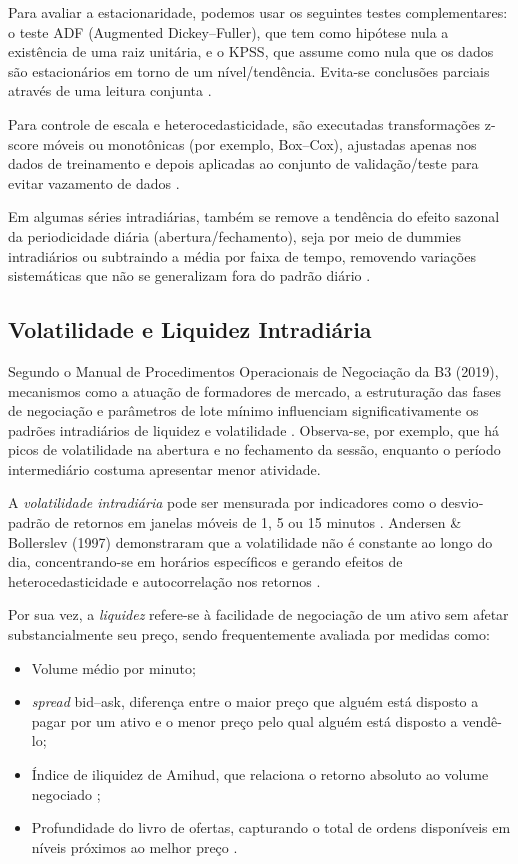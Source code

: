 Para avaliar a estacionaridade, podemos usar os seguintes testes complementares: o teste ADF (Augmented Dickey–Fuller), que tem como hipótese nula a existência de uma raiz unitária, e o KPSS, que assume como nula que os dados são estacionários em torno de um nível/tendência. Evita-se conclusões parciais através de uma leitura conjunta \cite{saiddickey1984}.

Para controle de escala e heterocedasticidade, são executadas transformações z-score móveis ou monotônicas (por exemplo, Box–Cox), ajustadas apenas nos dados de treinamento e depois aplicadas ao conjunto de validação/teste para evitar vazamento de dados \cite{hyndman2021fpp3}.

Em algumas séries intradiárias, também se remove a tendência do efeito sazonal da periodicidade diária (abertura/fechamento), seja por meio de dummies intradiários ou subtraindo a média por faixa de tempo, removendo variações sistemáticas que não se generalizam fora do padrão diário \cite{dacorogna2001}.


\subsection{Volatilidade e Liquidez Intradiária}

Segundo o Manual de Procedimentos Operacionais de Negociação da B3 (2019), mecanismos como a atuação de formadores de mercado, a estruturação das fases de negociação e parâmetros de lote mínimo influenciam significativamente os padrões intradiários de liquidez e volatilidade \cite{b3_manual_negociacao}. Observa-se, por exemplo, que há picos de volatilidade na abertura e no fechamento da sessão, enquanto o período intermediário costuma apresentar menor atividade.

A \emph{volatilidade intradiária} pode ser mensurada por indicadores como o desvio‐padrão de retornos em janelas móveis de 1, 5 ou 15 minutos \cite{andersen1997intraday}. Andersen \& Bollerslev (1997) demonstraram que a volatilidade não é constante ao longo do dia, concentrando-se em horários específicos e gerando efeitos de heterocedasticidade e autocorrelação nos retornos \cite{andersen1997intraday}.  

Por sua vez, a \emph{liquidez} refere-se à facilidade de negociação de um ativo sem afetar substancialmente seu preço, sendo frequentemente avaliada por medidas como:  
\begin{itemize}
  \item {Volume médio por minuto};  
  \item {\textit{spread} bid–ask}, diferença entre o maior preço que alguém está disposto a pagar por um ativo e o menor preço pelo qual alguém está disposto a vendê-lo;  
  \item {Índice de iliquidez de Amihud}, que relaciona o retorno absoluto ao volume negociado \cite{amihud2002illiquidity};  
  \item {Profundidade do livro de ofertas}, capturando o total de ordens disponíveis em níveis próximos ao melhor preço \cite{hasbrouck2007empirical}.  
\end{itemize}

